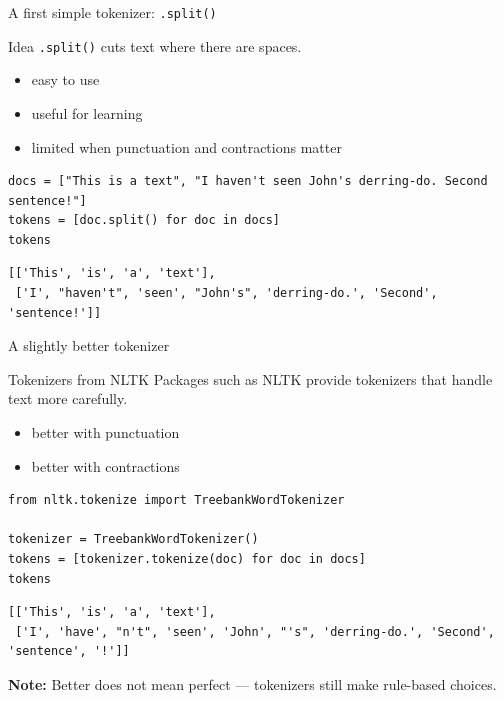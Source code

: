 \documentclass[handout]{beamer}
\begin{document}
\begin{frame}[fragile]{A first simple tokenizer: \texttt{.split()}}
\begin{block}{Idea}
\texttt{.split()} cuts text where there are spaces.
\end{block}

\begin{itemize}
	\item easy to use
	\item useful for learning
	\item limited when punctuation and contractions matter
\end{itemize}

\begin{verbatim}
docs = ["This is a text", "I haven't seen John's derring-do. Second sentence!"]
tokens = [doc.split() for doc in docs]
tokens
\end{verbatim}

\begin{verbatim}
[['This', 'is', 'a', 'text'],
 ['I', "haven't", 'seen', "John's", 'derring-do.', 'Second', 'sentence!']]
\end{verbatim}
\end{frame}

\begin{frame}[fragile]{A slightly better tokenizer}
\begin{block}{Tokenizers from NLTK}
Packages such as NLTK provide tokenizers that handle text more carefully.
\end{block}

\begin{itemize}
	\item better with punctuation
	\item better with contractions
\end{itemize}

\begin{verbatim}
from nltk.tokenize import TreebankWordTokenizer

tokenizer = TreebankWordTokenizer()
tokens = [tokenizer.tokenize(doc) for doc in docs]
tokens
\end{verbatim}

\pause

\begin{verbatim}
[['This', 'is', 'a', 'text'],
 ['I', 'have', "n't", 'seen', 'John', "'s", 'derring-do.', 'Second', 'sentence', '!']]
\end{verbatim}

\pause
\small \textbf{Note:} Better does not mean perfect — tokenizers still make rule-based choices.
\end{frame}
\end{document}

